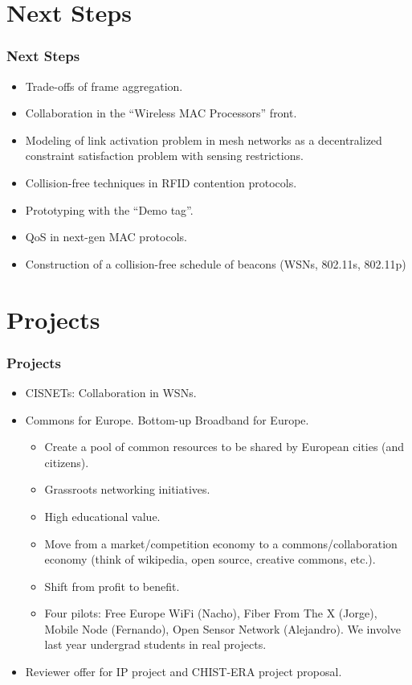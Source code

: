 \documentclass{beamer}
\begin{document}
\section{Next Steps}
\begin{frame}
  \frametitle{Next Steps}
      \begin{block}{}
        \begin{itemize}
          \item \alert<2>{Trade-offs of frame aggregation.}
          \item Collaboration in the ``Wireless MAC Processors'' front.
          \item Modeling of link activation problem in mesh networks as a decentralized constraint satisfaction problem with sensing restrictions.
          \item Collision-free techniques in RFID contention protocols.
          \item Prototyping with the ``Demo tag''.
          \item QoS in next-gen MAC protocols.
          \item Construction of a collision-free schedule of beacons (WSNs, 802.11s, 802.11p)
        \end{itemize}
      \end{block}
\end{frame}


\section{Projects}
\begin{frame}
  \frametitle{Projects}
      \begin{block}{}
        \begin{itemize}
          \item CISNETs: Collaboration in WSNs.
          \item Commons for Europe. Bottom-up Broadband for Europe.          \begin{itemize}
              \item Create a pool of common resources to be shared by European cities (and citizens).
              \item Grassroots networking initiatives.
              \item High educational value.
              \item Move from a market/competition economy to a commons/collaboration economy (think of wikipedia, open source, creative commons, etc.).
              \item Shift from profit to benefit.
              \item Four pilots: Free Europe WiFi (Nacho), Fiber From The X (Jorge), Mobile Node (Fernando), Open Sensor Network (Alejandro). We involve last year undergrad students in real projects.
          \end{itemize}
          \item Reviewer offer for IP project and CHIST-ERA project proposal.
        \end{itemize}
      \end{block}
\end{frame}
\end{document}
